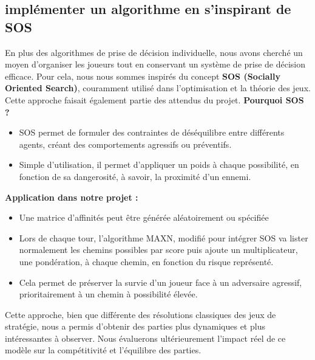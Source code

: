 \subsection{implémenter un algorithme en s'inspirant de SOS}
En plus des algorithmes de prise de décision individuelle, nous avons cherché un moyen d'organiser les joueurs tout en conservant un système de prise de décision efficace. Pour cela, nous nous sommes inspirés du concept \textbf{SOS (Socially Oriented Search)}, couramment utilisé dans l'optimisation et la théorie des jeux. Cette approche faisait également partie des attendus du projet.
\textbf{Pourquoi SOS ?}
\begin{itemize}
    \item SOS permet de formuler des contraintes de déséquilibre entre différents agents, créant des comportements agressifs ou préventifs.
    \item Simple d’utilisation, il permet d’appliquer un poids à chaque possibilité, en fonction de sa dangerosité, à savoir, la proximité d’un ennemi.
\end{itemize}

\newpage

\textbf{Application dans notre projet :}
\begin{itemize}
    \item Une matrice d’affinités peut être générée aléatoirement ou spécifiée
    \item Lors de chaque tour, l’algorithme MAXN, modifié pour intégrer SOS va lister normalement les chemins possibles par score puis ajoute un multiplicateur, une pondération, à chaque chemin, en fonction du risque représenté.
    \item Cela permet de préserver la survie d’un joueur face à un adversaire agressif, prioritairement à un chemin à possibilité élevée.
\end{itemize}
Cette approche, bien que différente des résolutions classiques des jeux de stratégie, nous a permis d'obtenir des parties plus dynamiques et plus intéressantes à observer. Nous évaluerons ultérieurement l'impact réel de ce modèle sur la compétitivité et l'équilibre des parties.


